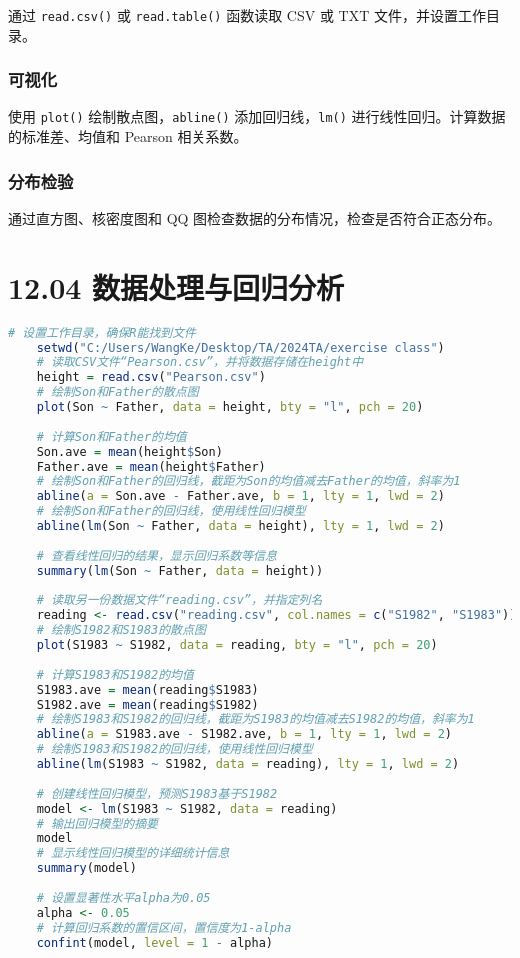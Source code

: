 \documentclass[UTF8]{report}
\theoremstyle{MyLineTheoremStyle} %
\theoremstyle{MyBlockTheoremStyle} %
\theoremstyle{MySubsubsectionStyle} %
\begin{document}
通过 \texttt{read.csv()} 或 \texttt{read.table()} 函数读取 CSV 或 TXT 文件，并设置工作目录。

\subsection*{可视化}

使用 \texttt{plot()} 绘制散点图，\texttt{abline()} 添加回归线，\texttt{lm()} 进行线性回归。计算数据的标准差、均值和 Pearson 相关系数。

\subsection*{分布检验}

通过直方图、核密度图和 QQ 图检查数据的分布情况，检查是否符合正态分布。




\chapter{12.04 数据处理与回归分析}

\begin{lstlisting}[language=R]
    # 设置工作目录，确保R能找到文件
    setwd("C:/Users/WangKe/Desktop/TA/2024TA/exercise class")  
    # 读取CSV文件“Pearson.csv”，并将数据存储在height中
    height = read.csv("Pearson.csv")  
    # 绘制Son和Father的散点图
    plot(Son ~ Father, data = height, bty = "l", pch = 20)  
    
    # 计算Son和Father的均值
    Son.ave = mean(height$Son)  
    Father.ave = mean(height$Father)  
    # 绘制Son和Father的回归线，截距为Son的均值减去Father的均值，斜率为1
    abline(a = Son.ave - Father.ave, b = 1, lty = 1, lwd = 2)  
    # 绘制Son和Father的回归线，使用线性回归模型
    abline(lm(Son ~ Father, data = height), lty = 1, lwd = 2)  
    
    # 查看线性回归的结果，显示回归系数等信息
    summary(lm(Son ~ Father, data = height))  
    
    # 读取另一份数据文件“reading.csv”，并指定列名
    reading <- read.csv("reading.csv", col.names = c("S1982", "S1983"))  
    # 绘制S1982和S1983的散点图
    plot(S1983 ~ S1982, data = reading, bty = "l", pch = 20)  
    
    # 计算S1983和S1982的均值
    S1983.ave = mean(reading$S1983)  
    S1982.ave = mean(reading$S1982)  
    # 绘制S1983和S1982的回归线，截距为S1983的均值减去S1982的均值，斜率为1
    abline(a = S1983.ave - S1982.ave, b = 1, lty = 1, lwd = 2)  
    # 绘制S1983和S1982的回归线，使用线性回归模型
    abline(lm(S1983 ~ S1982, data = reading), lty = 1, lwd = 2)  
    
    # 创建线性回归模型，预测S1983基于S1982
    model <- lm(S1983 ~ S1982, data = reading)  
    # 输出回归模型的摘要
    model  
    # 显示线性回归模型的详细统计信息
    summary(model)  
    
    # 设置显著性水平alpha为0.05
    alpha <- 0.05  
    # 计算回归系数的置信区间，置信度为1-alpha
    confint(model, level = 1 - alpha)  
    
    \end{lstlisting}
\end{document}
